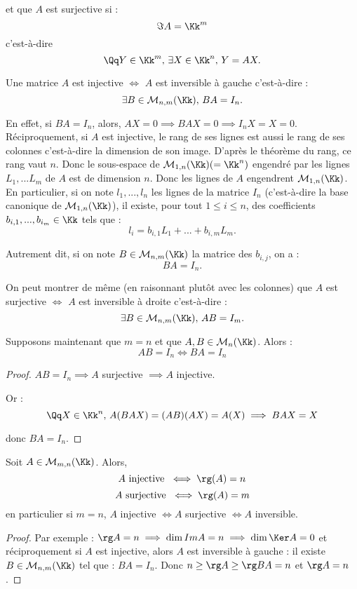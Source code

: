 \documentclass[class=report,crop=false]{standalone}
\begin{document}
et que $A$ est surjective si :
\[\Im A = \Kk^m\]
c'est-à-dire 
\[\Qq Y \in \Kk^m,\, \exists X \in \Kk^n,\, Y=AX .\]

Une matrice $A$ est injective $\iff$ $A$ est inversible à gauche c'est-à-dire :
\[\exists B \in \mathcal{M}_{n,m}(\Kk),\, BA = I_n.\]


En effet, si $BA = I_n$, alors, $AX = 0 \implies BAX=0 \implies I_nX=X =0$. Réciproquement, si $A$ est injective, le rang de ses lignes est aussi le rang de ses colonnes c'est-à-dire la dimension de son image. D'après le théorème du rang, ce rang vaut $n$. Donc le sous-espace de $\mathcal{M}_{1,n}(\Kk) (=\Kk^n)$ engendré par les  lignes $L_1,...L_m$ de $A$ est de dimension $n$. Donc les lignes de $A$ engendrent $\mathcal{M}_{1,n}(\Kk)$. En particulier, si on note $l_1,...,l_n$ les lignes de la matrice $I_n$ (c'est-à-dire la base canonique de $\mathcal{M}_{1,n}(\Kk)$), il existe, pour tout $1 \le i\le n$, des coefficients $b_{i,1},...,b_{i_m}\in \Kk$ tels que :
\[l_i = b_{i,1}L_1+...+b_{i,m}L_m .\]

Autrement dit, si on note $B\in \mathcal{M}_{n,m}(\Kk)$ la matrice des $b_{i,j}$, on a :
\[BA = I_n .\]

On peut montrer de même (en raisonnant plutôt avec les colonnes) que $A$ est surjective $\iff$ $A$ est inversible à droite c'est-à-dire :
\[\exists B \in \mathcal{M}_{n,m}(\Kk),\, AB = I_m .\]

Supposons maintenant que $m=n$ et que $A,B \in \mathcal{M}_n(\Kk)$.
Alors :
\[AB = I_n \iff BA =I_n\]

\begin{proof}
$AB = I_n \implies A$ surjective $\implies A$ injective.

Or : \[\Qq X \in \Kk^n,\, A(BA X) = (AB)(AX)  = A(X) \implies BAX = X \]

donc $BA = I_n$. 
\end{proof}



\begin{theoreme}
Soit $A \in\mathcal{M}_{m,n}(\Kk)$. Alors, \[A \mbox{ injective } \iff \rg(A) = n\]
\[A \mbox{ surjective }\iff \rg(A) =m\]
en particulier si $m=n$, $A$ injective $\iff A$ surjective $\iff A$ inversible.
\end{theoreme}

\begin{proof}
Par exemple : $\rg A = n \implies \dim Im A = n \implies \dim \Ker A =0$ et réciproquement si $A$ est injective, alors $A$ est inversible à gauche : il existe $B \in \mathcal{M}_{n,m}(\Kk)$ tel que : $BA = I_n$. Donc $n \ge \rg A\ge \rg BA =n$ et $\rg A =n$.
\end{proof}
\end{document}
